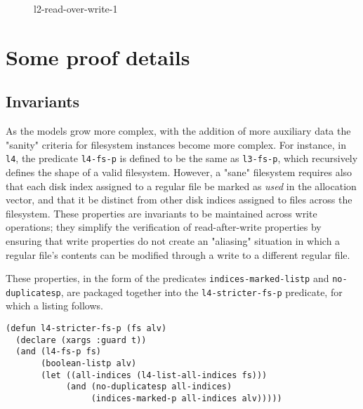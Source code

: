 \documentclass[runningheads,a4paper]{llncs}
\begin{document}
\begin{figure}
  \centering
  \caption{l2-read-over-write-1}
  \label{l2-read-over-write-1}
\end{figure}

\section{Some proof details}

\subsection{Invariants}

As the models grow more complex, with the addition of more auxiliary
data the "sanity" criteria for filesystem instances become more
complex. For instance, in \texttt{l4}, the predicate \texttt{l4-fs-p}
is defined to be the same as \texttt{l3-fs-p}, which recursively
defines the shape of a valid filesystem. However, a "sane" filesystem
requires also that each disk index assigned to a regular file be
marked as \textit{used} in the allocation vector, and that it be
distinct from other disk indices assigned to files across the
filesystem. These properties are invariants to be maintained across
write operations; they simplify the verification of read-after-write
properties by ensuring that write properties do not create an
"aliasing" situation in which a regular file's contents can be
modified through a write to a different regular file.

These properties, in the form of the predicates
\texttt{indices-marked-listp} and \texttt{no-duplicatesp}, are
packaged together into the \texttt{l4-stricter-fs-p} predicate, for
which a listing follows.

\medskip

\noindent
\begin{verbatim}
(defun l4-stricter-fs-p (fs alv)
  (declare (xargs :guard t))
  (and (l4-fs-p fs)
       (boolean-listp alv)
       (let ((all-indices (l4-list-all-indices fs)))
            (and (no-duplicatesp all-indices)
                 (indices-marked-p all-indices alv)))))
\end{verbatim}
\end{document}
